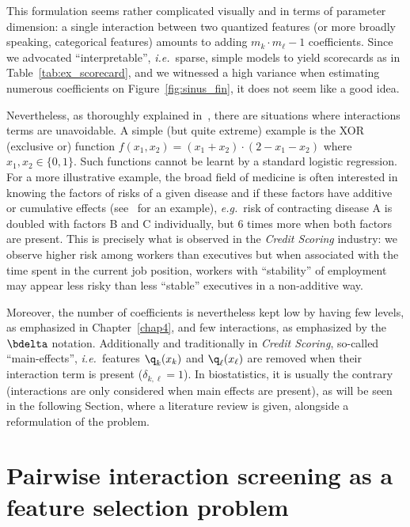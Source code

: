 This formulation seems rather complicated visually and in terms of parameter dimension: a single interaction between two quantized features (or more broadly speaking, categorical features) amounts to adding $m_k \cdot m_\ell - 1$ coefficients. Since we advocated ``interpretable'', \textit{i.e.}\ sparse, simple models to yield scorecards as in Table~\ref{tab:ex_scorecard}, and we witnessed a high variance when estimating numerous coefficients on Figure~\ref{fig:sinus_fin}, it does not seem like a good idea.

Nevertheless, as thoroughly explained in~\cite{berry2010testing}, there are situations where interactions terms are unavoidable. A simple (but quite extreme) example is the XOR (exclusive or) function $f(x_1,x_2) = (x_1 + x_2)\cdot(2 - x_1 - x_2)$ where $x_1,x_2 \in \{0,1\}$. Such functions cannot be learnt by a standard logistic regression. For a more illustrative example, the broad field of medicine is often interested in knowing the factors of risks of a given disease and if these factors have additive or cumulative effects (see~\cite{morgan2014adversity} for an example), \textit{e.g.}\ risk of contracting disease A is doubled with factors B and C individually, but 6 times more when both factors are present. This is precisely what is observed in the \textit{Credit Scoring} industry: we observe higher risk among workers than executives but when associated with the time spent in the current job position, workers with ``stability'' of employment may appear less risky than less ``stable'' executives in a non-additive way.

Moreover, the number of coefficients is nevertheless kept low by having few levels, as emphasized in Chapter~\ref{chap4}, and few interactions, as emphasized by the $\bdelta$ notation. Additionally and traditionally in \textit{Credit Scoring}, so-called ``main-effects'', \textit{i.e.}\ features $\q_k(x_k)$ and $\q_\ell(x_\ell)$ are removed when their interaction term is present ($\delta_{k,\ell} = 1$). In biostatistics, it is usually the contrary (interactions are only considered when main effects are present), as will be seen in the following Section, where a literature review is given, alongside a reformulation of the problem.


\section{Pairwise interaction screening as a feature selection problem}

